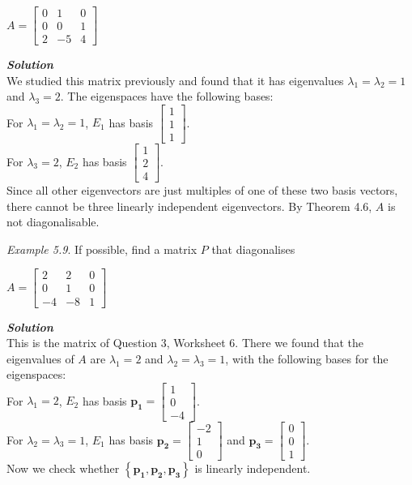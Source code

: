 \documentclass[
  letterpaper,
  DIV=11,
  numbers=noendperiod]{scrartcl}
\theoremstyle{remark}
\begin{document}
\(A = \left[\begin{array}{ccc}
            0 & 1 & 0 \\
            0 & 0 & 1 \\
            2 & -5 & 4
        \end{array}\right]\)

\textbf{\emph{Solution}}\\
We studied this matrix previously and found that it has eigenvalues
\(\lambda _{1} = \lambda _{2} = 1\) and \(\lambda _{3} = 2\). The
eigenspaces have the following bases:\\
For \(\lambda _{1} = \lambda _{2} = 1\), \(E_{1}\) has basis
\(\left[\begin{array}{c} 1 \\ 1 \\ 1 \end{array}\right]\).\\
For \(\lambda _{3} = 2\), \(E_{2}\) has basis
\(\left[\begin{array}{c} 1 \\ 2 \\ 4 \end{array}\right]\).\\
Since all other eigenvectors are just multiples of one of these two
basis vectors, there cannot be three linearly independent eigenvectors.
By Theorem 4.6, \(A\) is not diagonalisable.

\emph{Example 5.9}. If possible, find a matrix \(P\) that diagonalises

\(A = \left[\begin{array}{ccc}
            2 & 2 & 0 \\
            0 & 1 & 0 \\
            -4 & -8 & 1
        \end{array}\right]\)

\textbf{\emph{Solution}}\\
This is the matrix of Question 3, Worksheet 6. There we found that the
eigenvalues of \(A\) are \(\lambda _{1} = 2\) and
\(\lambda _{2} = \lambda _{3} = 1\), with the following bases for the
eigenspaces:\\
For \(\lambda _{1} = 2\), \(E_{2}\) has basis
\(\mathbf{p_{1}} = \left[\begin{array}{c} 1 \\ 0 \\ -4 \end{array}\right]\).\\
For \(\lambda _{2} = \lambda _{3} = 1\), \(E_{1}\) has basis
\(\mathbf{p_{2}} = \left[\begin{array}{c} -2 \\ 1 \\ 0 \end{array}\right]\)
and
\(\mathbf{p_{3}} = \left[\begin{array}{c} 0 \\ 0 \\ 1 \end{array}\right]\).\\
Now we check whether
\(\left\{\mathbf{p_{1}}, \mathbf{p_{2}}, \mathbf{p_{3}}\right\}\) is
linearly independent.
\end{document}

